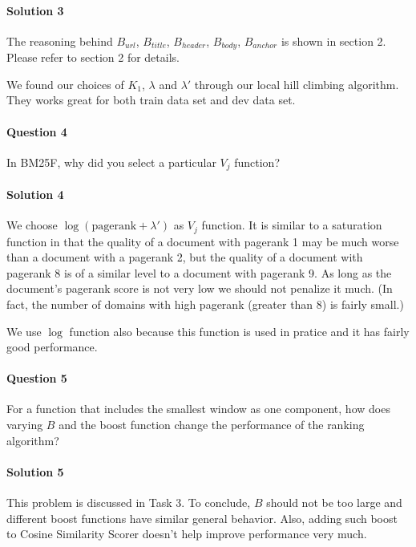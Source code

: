 \documentclass{article}
\begin{document}
\vspace{-3mm}
\paragraph{Solution 3}
The reasoning behind $B_{url}$, $B_{title}$, $B_{header}$, $B_{body}$, $B_{anchor}$ is shown in section 2. Please refer to section 2 for details.

We found our choices of $K_1$, $\lambda$ and $\lambda'$ through our local hill climbing algorithm. They works great for both train data set and dev data set.

\paragraph{Question 4}
In BM25F, why did you select a particular $V_j$ function?

\vspace{-3mm}
\paragraph{Solution 4}
We choose $\log (\mbox{pagerank} + \lambda')$ as $V_j$ function. It is similar to a saturation function in that the quality of a document with pagerank 1 may be much worse than a document with a pagerank 2, but the quality of a document with pagerank 8 is of a similar level to a document with pagerank 9. As long as the document's pagerank score is not very low we should not penalize it much. (In fact, the number of domains with high pagerank (greater than 8) is fairly small.)

We use $\log$ function also because this function is used in pratice and it has fairly good performance.

\paragraph{Question 5}
For a function that includes the smallest window as one component, how does varying $B$ and the boost function change the performance of the ranking algorithm?

\vspace{-3mm}
\paragraph{Solution 5}
This problem is discussed in Task 3. To conclude, $B$ should not be too large and different boost functions have similar general behavior. Also, adding such boost to Cosine Similarity Scorer doesn't help improve performance very much.
\end{document}
